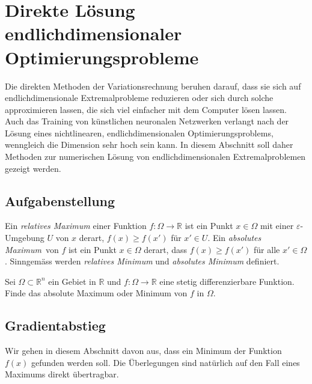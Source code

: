%
%
%
\section{Direkte Lösung endlichdimensionaler Optimierungsprobleme
\label{buch:direkt:section:gradient}}
Die direkten Methoden der Variationsrechnung beruhen darauf, dass
sie sich auf endlichdimensionale Extremalprobleme reduzieren oder
sich durch solche approximieren lassen, die sich viel einfacher
mit dem Computer lösen lassen.
Auch das Training von künstlichen neuronalen Netzwerken verlangt nach
der Lösung eines nichtlinearen, endlichdimensionalen Optimierungsproblems,
wenngleich die Dimension sehr hoch sein kann.
In diesem Abschnitt soll daher Methoden zur numerischen Lösung von
endlichdimensionalen Extremalproblemen gezeigt werden.

%
%
\subsection{Aufgabenstellung
\label{buch:direkt:gradient:subsection:aufgabenstellung}}

\begin{definition}
Ein {\em relatives Maximum} einer Funktion $f\colon\Omega\to\mathbb{R}$
ist ein Punkt $x\in\Omega$ mit einer $\varepsilon$-Umgebung
$U$ von $x$ derart, $f(x)\ge f(x')$ für $x'\in U$.
Ein {\em absolutes Maximum} von $f$ ist ein Punkt $x\in\Omega$ derart,
dass $f(x)\ge f(x')$ für alle $x'\in\Omega$.
Sinngemäss werden {\em relatives Minimum} und {\em absolutes Minimum}
definiert.
%
%
%
%
%
%
%
%
\end{definition}

\begin{aufgabe}
\label{buch:direkt:gradient:aufgabe:extremal}
Sei $\Omega\subset\mathbb{R}^n$ ein Gebiet in $\mathbb{R}$ und
$f\colon\Omega\to\mathbb{R}$ eine stetig differenzierbare
Funktion.
Finde das absolute Maximum oder Minimum von $f$ in $\Omega$.
\end{aufgabe}

%
%
\subsection{Gradientabstieg
\label{buch:direkt:gradient:subsection:gradientabstieg}}
Wir gehen in diesem Abschnitt davon aus, dass ein Minimum der Funktion
$f(x)$ gefunden werden soll.
Die Überlegungen sind natürlich auf den Fall eines Maximums direkt
übertragbar.

